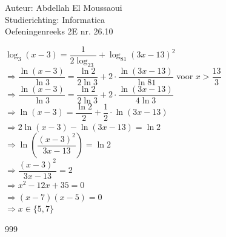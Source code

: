 \documentclass[a4paper]{article}
\begin{document}
  
\noindent \large Auteur: Abdellah El Moussaoui \\
\noindent \large Studierichting: Informatica\\
\noindent \large Oefeningenreeks 2E nr. 26.10\\

\medskip

\normalsize

$\log_3\left(x-3\right)=\dfrac{1}{2\log_23}+\log_{81}\left(3x-13\right)^2$\\

$\Rightarrow \dfrac{\ln{\left(x-3\right)}}{\ln3}=\dfrac{\ln2}{2\ln3}+2 \cdot \dfrac{\ln{\left(3x-13\right)}}{\ln81}$ voor $x > \dfrac{13}{3}$\\

$\Rightarrow \dfrac{\ln{\left(x-3\right)}}{\ln3}=\dfrac{\ln2}{2\ln3}+2 \cdot \dfrac{\ln{\left(3x-13\right)}}{4\ln3}$\\

$\Rightarrow \ln{\left(x-3\right)}=\dfrac{\ln2}{2}+\dfrac{1}{2} \cdot \ln{\left(3x-13\right)}$\\

$\Rightarrow 2\ln{\left(x-3\right)} - \ln{\left(3x-13\right)}=\ln2$\\

$\Rightarrow \ln{\left(\dfrac{\left(x-3\right)^2}{3x-13}\right)}=\ln2$\\

$\Rightarrow \dfrac{\left(x-3\right)^2}{3x-13} = 2$\\

$\Rightarrow x^2-12x+35 = 0$\\

$\Rightarrow \left(x-7\right)\left(x-5\right)=0$\\

$\Rightarrow \boxed{x\in\{5,7\}}$\\



\begin{thebibliography}{999}
\end{thebibliography}
\end{document}
